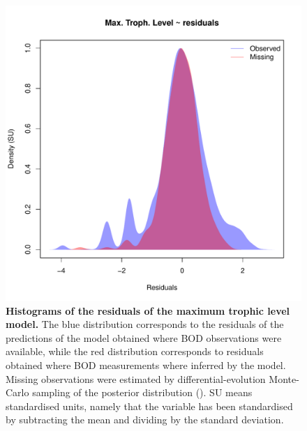 \documentclass[11pt, oneside]{article}
\begin{document}
\begin{figure}[H]
\begin{center}
\includegraphics[page=1, width=1\linewidth]{b0_6_2/out_mTL/fig_hist_residuals.pdf}
\caption{
    \textbf{Histograms of the residuals of the maximum trophic level model.}
    The blue distribution corresponds to the residuals of the predictions of the model obtained where BOD observations were available, while the red distribution corresponds to residuals obtained where BOD measurements where inferred by the model.
    Missing observations were estimated by differential-evolution Monte-Carlo sampling of the posterior distribution (\cite{TerBraak2006}).
    SU means standardised units, namely that the variable has been standardised by subtracting the mean and dividing by the standard deviation.
} 
\end{center}
\end{figure}
\end{document}
